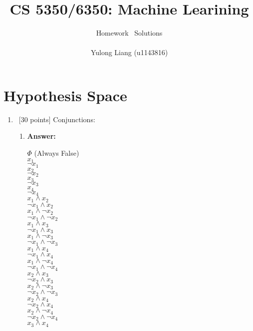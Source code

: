 \documentclass[12pt, fullpage,letterpaper]{article}
\title{CS 5350/6350: Machine Learining \semester}
\author{Homework \assignmentId\ Solutions\\\\Yulong Liang (u1143816)}
\begin{document}
\maketitle

\section{Hypothesis Space}

\begin{enumerate}
\item~[30 points] Conjunctions:

\begin{enumerate}
\item \textbf{Answer:}
\begin{multicols}{3}
$\Phi$ (Always False)\\
$x_1$\\
$\neg x_1$\\
$x_2$\\
$\neg x_2$\\
$x_3$\\
$\neg x_3$\\
$x_4$\\
$\neg x_4$\\
$x_1 \wedge x_2$\\
$\neg x_1 \wedge x_2$\\
$x_1 \wedge \neg x_2$\\
$\neg x_1 \wedge \neg x_2$\\
$x_1 \wedge x_3$\\
$\neg x_1 \wedge x_3$\\
$x_1 \wedge \neg x_3$\\
$\neg x_1 \wedge \neg x_3$\\
$x_1 \wedge x_4$\\
$\neg x_1 \wedge x_4$\\
$x_1 \wedge \neg x_4$\\
$\neg x_1 \wedge \neg x_4$\\
$x_2 \wedge x_3$\\
$\neg x_2 \wedge x_3$\\
$x_2 \wedge \neg x_3$\\
$\neg x_2 \wedge \neg x_3$\\
$x_2 \wedge x_4$\\
$\neg x_2 \wedge x_4$\\
$x_2 \wedge \neg x_4$\\
$\neg x_2 \wedge \neg x_4$\\
$x_3 \wedge x_4$\\

\end{multicols}
\end{enumerate}
\end{enumerate}
\end{document}
